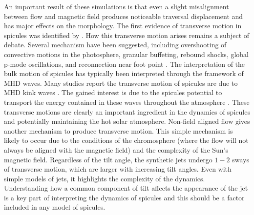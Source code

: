 \documentclass[12pt]{ociamthesis}
\newcommand{\np}{\\ \\}
\begin{document}
An important result of these simulations is that even a slight misalignment between flow and magnetic field produces noticeable traversal displacement and has major effects on the morphology. The first evidence of transverse motion in spicules was identified by \cite{Pasachoff1968SoPh5131P}. How this transverse motion arises remains a subject of debate. Several mechanism have been suggested, including overshooting of convective motions in the photosphere, granular buffeting, rebound shocks, global p-mode oscillations, and reconnection near foot point \citep{Roberts1979SoPh6123R, Sterling1988ApJ327950S, Vranjes2008A_A478553V, Jess2012ApJ744L5J, Ebadi2014Ap_SS353_31E}. The interpretation of the bulk motion of spicules has typically been interpreted through the framework of MHD waves. Many studies report the transverse motion of spicules are due to MHD kink waves \citep{Kukhianidze2006A_A449L35K, dePontieu2007Sci3181574D, Jess2012ApJ744L5J, Ebadi2014ApSS35331E, Tavabi2015AA573A4T, Jafarzadeh2017ApJS2299J}. The gained interest is due to the spicules potential to transport the energy contained in these waves throughout the atmosphere \citep{dePontieu2007Sci3181574D, He2009ApJ705L217H, Morton2012NatCo31315M, Jess2012ApJ744L5J}.  These transverse motions are clearly an important ingredient in the dynamics of spicules and potentially maintaining the hot solar atmosphere. Non-field aligned flow gives another mechanism to produce transverse motion. This simple mechanism is likely to occur due to the conditions of the chromosphere (where the flow will not always be aligned with the magnetic field) and the complexity of the Sun’s magnetic field. Regardless of the tilt angle, the synthetic jets undergo $1-2$ sways of transverse motion, which are larger with increasing tilt angles. Even with simple models of jets, it highlights the complexity of the dynamics. Understanding how a common component of tilt affects the appearance of the jet is a key part of interpreting the dynamics of spicules and this should be a factor included in any model of spicules. \np
%



  
\end{document}
